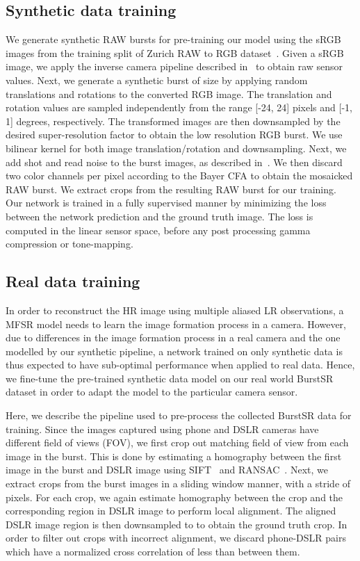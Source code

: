 \subsection{Synthetic data training}
\label{sec:synthetic_training}
We generate synthetic RAW bursts for pre-training our model using the sRGB images from the training split of Zurich RAW to RGB dataset~\cite{ignatov2020replacing}. Given a sRGB image, we apply the inverse camera pipeline described in~\cite{Brooks2019UnprocessingIF} to obtain raw sensor values. 
Next, we generate a synthetic burst of size  by applying random translations and rotations to the converted RGB image. The translation and rotation values are sampled independently from the range [-24, 24] pixels and [-1, 1] degrees, respectively. The transformed images are then downsampled by the desired super-resolution factor  to obtain the low resolution RGB burst. We use bilinear kernel for both image translation/rotation and downsampling. Next, we add shot and read noise to the burst images, as described in~\cite{Brooks2019UnprocessingIF}.  We then discard two color channels per pixel according to the Bayer CFA to obtain the mosaicked RAW burst. We extract  crops from the resulting RAW burst for our training. Our network is trained in a fully supervised manner by minimizing the  loss between the network prediction and the ground truth image. The loss is computed in the linear sensor space, before any post processing \eg gamma compression or tone-mapping.



\subsection{Real data training}
\label{sec:real_data_training}
In order to reconstruct the HR image using multiple aliased LR observations, a MFSR model needs to learn the image formation process in a camera. 
However, due to differences in the image formation process in a real camera and the one modelled by our synthetic pipeline, a network trained on only synthetic data is thus expected to have sub-optimal performance when applied to real data. Hence, we fine-tune the pre-trained synthetic data model on our real world BurstSR dataset in order to adapt the model to the particular camera sensor. 

Here, we describe the pipeline used to pre-process the collected BurstSR data for training. Since the images captured using phone and DSLR cameras have different field of views (FOV), we first crop out matching field of view from each image in the burst. This is done by estimating a homography between the first image in the burst and DSLR image using SIFT~\cite{Lowe1999ObjectRF} and RANSAC~\cite{Fischler1981RandomSC}. Next, we extract  crops from the burst images in a sliding window manner, with a stride of  pixels. For each crop, we again estimate homography between the crop and the corresponding region in DSLR image to perform local alignment. The aligned DSLR image region is then downsampled to  to obtain the ground truth crop. In order to filter out crops with incorrect alignment, we discard phone-DSLR pairs which have a normalized cross correlation of less than  between them. 

